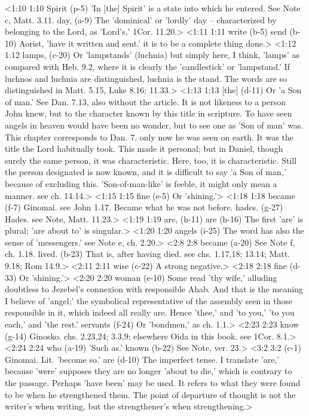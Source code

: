 <1:10 1:10  Spirit (p-5)  'In [the] Spirit' is a state into which he entered. See  Note c, Matt. 3.11.
  day, (a-9)  The 'dominical' or 'lordly' day -- characterized by belonging  to the Lord, as 'Lord's,' 1Cor. 11.20.>
<1:11 1:11  write (b-5)  send (b-10)
  Aorist, 'have it written and sent.' it is to be a complete  thing done.>
<1:12 1:12  lamps, (c-20)  Or 'lampstands' (luchnia) but simply here, I think, 'lamps'  as compared with Heb. 9.2, where it is clearly the  'candlestick' or 'lampstand.' If luchnos and luchnia are  distinguished, luchnia is the stand. The words are so  distinguished in Matt. 5.15, Luke 8.16; 11.33.>
<1:13 1:13  [the] (d-11)  Or 'a Son of man.' See Dan. 7.13, also without the article.  It is not likeness to a person John knew, but to the character  known by this title in scripture. To have seen angels in heaven  would have been no wonder, but to see one as 'Son of man' was.  This chapter corresponds to Dan. 7. only now he was seen on  earth. It was the title the Lord habitually took. This made it  personal; but in Daniel, though surely the same person, it was  characteristic. Here, too, it is characteristic. Still the  person designated is now known, and it is difficult to say 'a  Son of man,' because of excluding this. 'Son-of-man-like' is  feeble, it might only mean a manner. see ch. 14.14.>
<1:15 1:15  fine (e-5)  Or 'shining.'>
<1:18 1:18  became (f-7)  Ginomai. see John 1.17. Became what he was not before.
  hades. (g-27)  Hades. see Note, Matt. 11.23.>
<1:19 1:19  are, (h-11)  are (h-16)
  The first 'are' is plural; 'are about to' is singular.>
<1:20 1:20  angels (i-25)  The word has also the sense of 'messengers.' see Note e, ch. 2.20.>
<2:8 2:8  became (a-20)  See Note f, ch. 1.18.
  lived. (b-23)  That is, after having died. see chs. 1.17,18; 13.14; Matt.  9.18; Rom 14.9.>
<2:11 2:11  wise (c-22)  A strong negative.>
<2:18 2:18  fine (d-33)  Or 'shining.'>
<2:20 2:20  woman (e-10)  Some read 'thy wife,' alluding doubtless to Jezebel's  connexion with responsible Ahab. And that is the meaning I  believe of 'angel;' the symbolical representative of the  assembly seen in those responsible in it, which indeed all  really are. Hence 'thee,' and 'to you,' 'to you each,' and 'the  rest.'
  servants (f-24)  Or 'bondmen,' as ch. 1.1.>
<2:23 2:23  know (g-14)  Ginosko. chs. 2.23,24; 3.3,9; elsewhere Oida in this  book. see 1Cor. 8.1.>
<2:24 2:24  who (a-19)  'Such as.'
  known (b-22)  See Note, ver. 23.>
<3:2 3:2   (c-1)  Ginomai. Lit. 'become so.'
  are (d-10)  The imperfect tense. I translate 'are,' because 'were'  supposes they are no longer 'about to die,' which is contrary  to the passage. Perhaps 'have been' may be used. It refers to  what they were found to be when he strengthened them. The point  of departure of thought is not the writer's when writing, but  the strengthener's when strengthening.>
